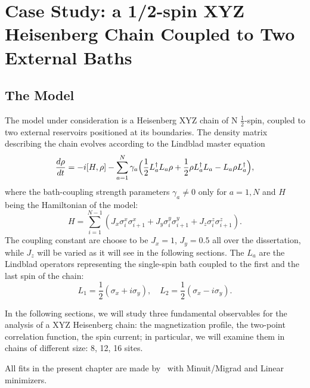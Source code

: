 \chapter{Case Study: a 1/2-spin XYZ Heisenberg Chain Coupled to Two External Baths}
\label{Chapter3}

\section{The Model}
\label{sec:model}
The model under consideration is a Heisenberg XYZ chain of N $\frac{1}{2}$-spin, coupled to two external reservoirs positioned at its boundaries. The density matrix describing the chain evolves according to the Lindblad master equation
\begin{equation}
    \frac{d\rho}{dt} = -i[H, \rho] - \sum_{a=1}^{N}\gamma_a\Bigl(\frac{1}{2}L_a^{\dagger}L_a\rho + \frac{1}{2}\rho L_a^{\dagger}L_a - L_a\rho L_a^{\dagger}\Bigl),
\end{equation}
where the bath-coupling strength parameters $\gamma_a \neq 0$ only for $a = 1, N$ and
$H$ being the Hamiltonian of the model:
\begin{equation}
\label{ham_chain}
    H = \sum_{i = 1}^{N-1} (J_x \sigma_i^x \sigma_{i+1}^x + J_y \sigma_i^y \sigma_{i+1}^y + J_z \sigma_i^z \sigma_{i+1}^z).
\end{equation}
The coupling constant are choose to be $J_x = 1$, $J_y = 0.5$ all over the dissertation, while $J_z$ will be varied as it will see in the following sections.
The $L_a$ are the Lindblad operators representing the single-spin bath coupled to the first and the last spin of the chain:
\begin{equation}
\label{dissipators}
    L_1 = \frac{1}{2}(\sigma_x + i\sigma_y), \quad L_2 = \frac{1}{2}(\sigma_x - i\sigma_y).
\end{equation}


In the following sections, we will study three fundamental observables for the analysis of a XYZ Heisenberg chain: the magnetization profile, the two-point correlation function, the spin current; in particular, we will examine them in chains of different size: 8, 12, 16 sites. 

All fits in the present chapter are made by~\cite{root_cern} with Minuit/Migrad and Linear minimizers.

